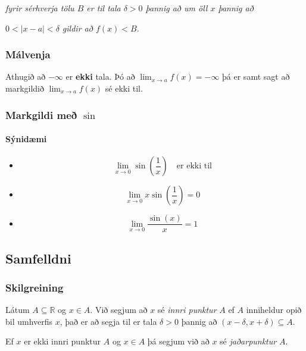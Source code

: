 \documentclass[icelandic,a4paper,12pt]{article}
\newcommand{\R}{{\mathbb  R}}
\begin{document}
{\it fyrir sérhverja tölu $B$ er til tala $\delta>0$ þannig
  að um öll $x$ þannig að} 

{\em $0<|x-a|<\delta$ 
gildir að  $f(x)<B$.}




\subsubsection*{Málvenja}
Athugið að $-\infty$ er {\bf ekki} tala.  Þó 
að  $\lim_{x\rightarrow a} f(x)=-\infty$ þá er samt sagt að
markgildið $\lim_{x\rightarrow a} f(x)$ sé ekki til.
 


\subsubsection*{Markgildi með $\sin$}
\paragraph{Sýnidæmi}
\begin{itemize}
  \item $$\lim_{x\to 0} \sin\left(\frac 1x\right) \quad \text{er ekki til}$$
  \pause
  \item $$\lim_{x\to 0} x\sin\left(\frac 1x\right) = 0$$
  \pause
  \item $$\lim_{x \to 0} \frac{\sin(x)}{x} = 1$$
\end{itemize}




\subsection*{Samfelldni}

\subsubsection*{Skilgreining}
Látum $A\subseteq \R$ og $x\in A$.  Við segjum að $x$ sé {\em innri
  punktur} $A$ ef $A$ inniheldur opið bil umhverfis $x$, það er að
segja til er tala $\delta>0$ þannig að $(x-\delta, x+\delta)\subseteq
A$. 

\pause

Ef $x$ er ekki innri punktur $A$ og $x\in A$ þá segjum við að $x$ sé
{\em jaðarpunktur} $A$.
\end{document}
